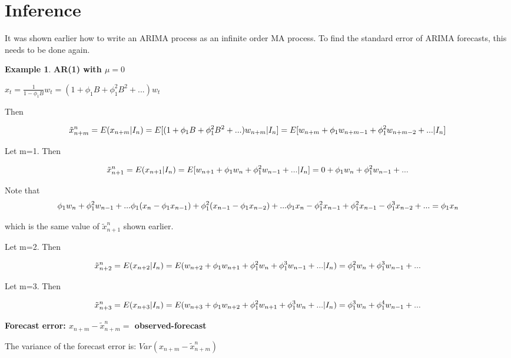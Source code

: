 \documentclass[
]{book}
\theoremstyle{definition}
\theoremstyle{definition}
\newtheorem{example}{Example}[chapter]
\theoremstyle{definition}
\theoremstyle{definition}
\theoremstyle{remark}
\begin{document}
\hypertarget{inference}{%
\section{Inference}\label{inference}}

It was shown earlier how to write an ARIMA process as an infinite order MA process. To find the standard error of ARIMA forecasts, this needs to be done again.

\begin{example}
\textbf{AR(1) with \(\mu=0\)}

\(x_t=\frac{1}{1-\phi_1B}w_t=(1+\phi_1B+\phi_1^2B^2+...)w_t\)

Then

\[\tilde x^n_{n+m}=E(x_{n+m}| I_n)\\
=E[(1+\phi_1B+\phi_1^2B^2+...)w_{n+m}|I_n]\\
=E[w_{n+m}+\phi_1w_{n+m-1}+\phi_1^2w_{n+m-2}+...| I_n]\]

Let m=1. Then

\[\tilde x^n_{n+1}=E(x_{n+1}| I_n)\\
=E[w_{n+1}+\phi_1w_n+\phi_1^2w_{n-1}+...| I_n]\\
=0+\phi_1w_n+\phi_1^2w_{n-1}+...\]

Note that \[\phi_1w_n+\phi_1^2w_{n-1}+...\\
\phi_1(x_n-\phi_1x_{n-1})+\phi_1^2(x_{n-1}-\phi_1x_{n-2})+...\\
\phi_1x_n-\phi_1^2x_{n-1}+\phi_1^2x_{n-1}-\phi_1^3x_{n-2}+...\\
=\phi_1x_n\]

which is the same value of \(\tilde x^n_{n+1}\) shown earlier.

Let m=2. Then

\[\tilde x^n_{n+2}=E(x_{n+2}| I_n)\\
=E(w_{n+2}+\phi_1w_{n+1}+\phi_1^2w_n+\phi^3_1w_{n-1}+...| I_n)\\
=\phi_1^2w_n+\phi_1^3w_{n-1}+...\]

Let m=3. Then

\[\tilde x^n_{n+3}=E(x_{n+3}| I_n)\\
=E(w_{n+3}+\phi_1w_{n+2}+\phi_1^2w_{n+1}+\phi^3_1w_{n}+...| I_n)\\
=\phi_1^3w_n+\phi_1^4w_{n-1}+...\]
\end{example}

\textbf{Forecast error: \(x_{n+m}-\tilde x^n_{n+m}=\) observed-forecast}

The variance of the forecast error is: \(Var(x_{n+m}-\tilde x^n_{n+m})\)
\end{document}
